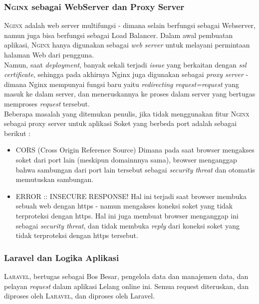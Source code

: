     \subsubsection{\textbf{\textsc{Nginx} sebagai WebServer dan Proxy Server}}
    {\scshape Nginx} adalah web server multifungsi - dimana selain berfungsi sebagai Webserver, namun juga bisa berfungsi sebagai Load Balancer. Dalam awal pembuatan aplikasi, \textsc{Nginx} hanya digunakan sebagai \textit{web server} untuk melayani permintaan halaman Web dari pengguna.
    \\
    Namun, saat \textit{deployment}, banyak sekali terjadi \textit{issue} yang berkaitan dengan \textit{ssl certificate}, sehingga pada akhirnya Nginx juga digunakan sebagai \textit{proxy server} - dimana Nginx mempunyai fungsi baru yaitu \textit{redirecting request=request} yang masuk ke dalam server, dan meneruskannya ke proses dalam server yang bertugas memproses \textit{request} tersebut.
   \\
    Beberapa masalah yang ditemukan penulis, jika tidak menggunakan fitur \textsc{Nginx} sebagai proxy server untuk aplikasi Soket yang berbeda port adalah sebagai berikut :
    \begin{itemize}[noitemsep,topsep=0pt]
    \item CORS (Cross Origin Reference Source)
    \newline
    Dimana pada saat browser mengakses soket dari port lain (meskipun domainnnya sama), browser menganggap bahwa sambungan dari port lain tersebut sebagai \textit{security threat} dan otomatis memutuskan sambungan.
    \item ERROR :: INSECURE RESPONSE!
    \newline
    Hal ini terjadi saat browser membuka sebuah web dengan https - namun mengakses koneksi soket yang tidak terproteksi dengan https. Hal ini juga membuat browser menganggap ini sebagai \textit{security threat}, dan tidak membuka \textit{reply} dari koneksi soket yang tidak terproteksi dengan https tersebut.
    \end{itemize}
    
    \subsubsection {\textbf{Laravel dan Logika Aplikasi}}
    \textsc{Laravel}, bertugas sebagai Bos Besar, pengelola data dan manajemen data, dan pelayan \textit{request} dalam aplikasi Lelang online ini. Semua request diteruskan, dan diproses oleh \textsc{Laravel}, dan diproses oleh Laravel. 
    \\
	    
